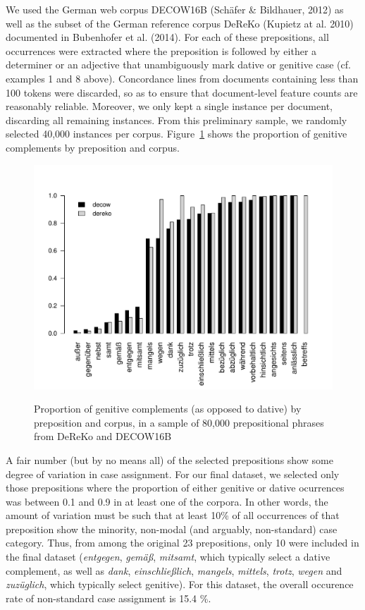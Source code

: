 \documentclass[11pt]{article}
\begin{document}
We used the German web corpus DECOW16B (Schäfer \& Bildhauer, 2012) as well as the subset of the German reference corpus DeReKo (Kupietz at al. 2010) documented in Bubenhofer et al. (2014). For each of these prepositions, all occurrences were extracted where the preposition is followed by either a determiner or an adjective that unambiguously mark dative or genitive case (cf. examples 1 and 8 above). Concordance lines from documents containing less than 100 tokens were discarded, so as to ensure that document-level feature counts are reasonably reliable. Moreover, we only kept a single instance per document, discarding all remaining instances. From this preliminary sample, we randomly selected 40,000 instances per corpus. Figure~\ref{genprops} shows the proportion of genitive complements by preposition and corpus.

\begin{figure}
   \includegraphics[scale=.7]{../R/prep-genitive-proportions}
   \label{genprops}
  \caption{Proportion of genitive complements (as opposed to dative) by preposition and corpus, in a sample of 80,000 prepositional phrases from DeReKo and DECOW16B}  
\end{figure}


A fair number (but by no means all) of the selected prepositions show some degree of variation in case assignment. For our final dataset, we selected only those prepositions where the proportion of either genitive or dative ocurrences was between 0.1 and 0.9 in at least one of the corpora. In other words, the amount of variation must be such that at least 10\% of all occurrences of that preposition show the minority, non-modal (and arguably, non-standard) case category. Thus, from among the original 23 prepositions, only 10 were included in the final dataset (\textit{entgegen}, \textit{gem\"a\ss}, \textit{mitsamt}, which typically select a dative complement, as well as \textit{dank}, \textit{einschlie{\ss}lich}, \textit{mangels}, \textit{mittels}, \textit{trotz}, \textit{wegen} and \textit{zuz\"uglich}, which typically select genitive). For this dataset, the overall occurence rate of non-standard case assignment is 15.4 \%.
\end{document}
